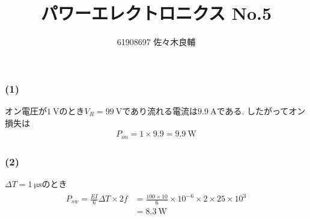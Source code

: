 \documentclass[uplatex,a4j,11pt,dvipdfmx]{jsarticle}
\begin{document}
\title{パワーエレクトロニクス No.5}
\author{61908697 佐々木良輔}
\date{}
\maketitle
\subsubsection*{(1)}
オン電圧が$1\ \si{\volt}$のとき$V_R=99\ \si{\volt}$であり流れる電流は$9.9\ \si{\ampere}$である.
したがってオン損失は
\begin{align}
  P_{on}=1\times9.9=9.9\ \si{\watt}
\end{align}
\subsubsection*{(2)}
$\Delta T=1\ \si{\micro\second}$のとき
\begin{align}
  \begin{split}
    P_{sw}=\frac{EI}{6}\Delta T\times 2f&=\frac{100\times 10}{6}\times10^{-6}\times 2\times25\times10^3\\
    &=8.3\ \si{\watt}
  \end{split}
\end{align}
\end{document}
